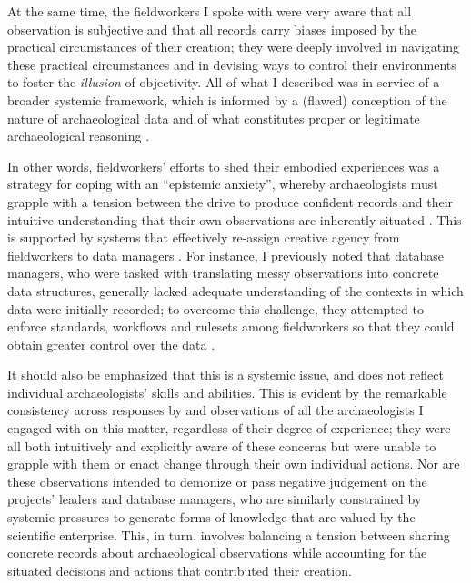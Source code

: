 \documentclass{article}
\begin{document}
At the same time, the fieldworkers I spoke with were very aware that all
observation is subjective and that all records carry biases imposed by
the practical circumstances of their creation; they were deeply involved
in navigating these practical circumstances and in devising ways to
control their environments to foster the \emph{illusion} of objectivity.
All of what I described was in service of a broader systemic framework,
which is informed by a (flawed) conception of the nature of
archaeological data and of what constitutes proper or legitimate
archaeological reasoning \parencite{batist-alienation}.

In other words, fieldworkers' efforts to shed their embodied experiences
was a strategy for coping with an ``epistemic anxiety'', whereby
archaeologists must grapple with a tension between the drive to produce
confident records and their intuitive understanding that their own
observations are inherently situated
\parencites[274-278]{huggett2022a}[55-57]{lucas2019}{wylie2017,batist2024a}.
This is supported by systems that effectively re-assign creative agency
from fieldworkers to data managers
\parencites{batist2024a}{batist-alienation}. For instance, I previously
noted that database managers, who were tasked with translating messy
observations into concrete data structures, generally lacked adequate
understanding of the contexts in which data were initially recorded; to
overcome this challenge, they attempted to enforce standards, workflows
and rulesets among fieldworkers so that they could obtain greater
control over the data \parencite{batist2024a}.

It should also be emphasized that this is a systemic issue, and does not
reflect individual archaeologists' skills and abilities. This is evident
by the remarkable consistency across responses by and observations of
all the archaeologists I engaged with on this matter, regardless of
their degree of experience; they were all both intuitively and
explicitly aware of these concerns but were unable to grapple with them
or enact change through their own individual actions. Nor are these
observations intended to demonize or pass negative judgement on the
projects' leaders and database managers, who are similarly constrained
by systemic pressures to generate forms of knowledge that are valued by
the scientific enterprise. This, in turn, involves balancing a tension
between sharing concrete records about archaeological observations while
accounting for the situated decisions and actions that contributed their
creation.
\end{document}
